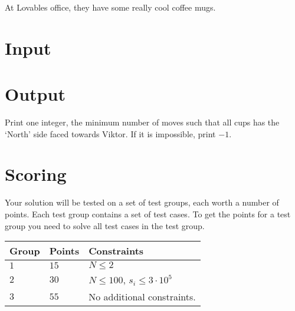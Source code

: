 

At Lovables office, they have some really cool coffee mugs. 



\section*{Input}


\section*{Output}
Print one integer, the minimum number of moves such that all cups has the `North' side faced towards Viktor. If it is impossible, print $-1$. 

\section*{Scoring}
Your solution will be tested on a set of test groups, each worth a number of points. Each test group contains
a set of test cases. To get the points for a test group you need to solve all test cases in the test group.

\noindent
\begin{tabular}{| l | l | p{12cm} |}
  \hline
  \textbf{Group} & \textbf{Points} & \textbf{Constraints} \\ \hline
  $1$    & $15$        & $N \leq 2$ \\ \hline
  $2$    & $30$       & $N \leq 100$, $s_i \leq 3 \cdot 10^5$ \\ \hline
  $3$    & $55$       & No additional constraints. \\ \hline
\end{tabular}